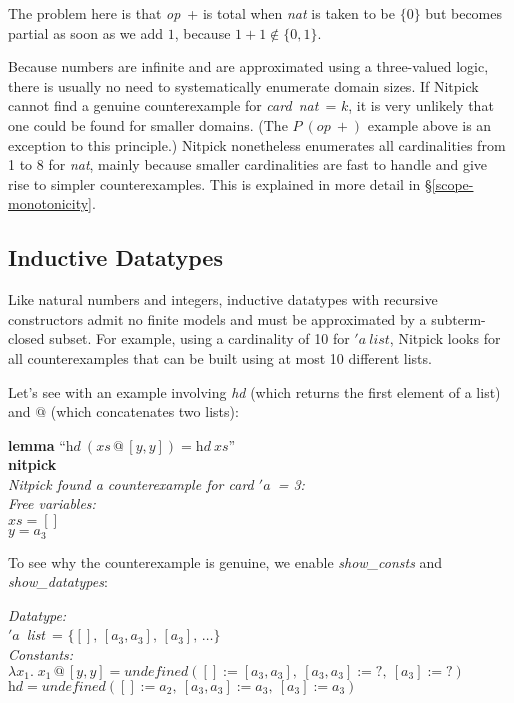 \documentclass[a4paper,12pt]{article}
\def\undef{\textit{undefined}}
\def\unk{{?}}
\def\unr{\ldots}
\begin{document}
The problem here is that \textit{op}~+ is total when \textit{nat} is taken to be
$\{0\}$ but becomes partial as soon as we add $1$, because $1 + 1 \notin \{0,
1\}$.

Because numbers are infinite and are approximated using a three-valued logic,
there is usually no need to systematically enumerate domain sizes. If Nitpick
cannot find a genuine counterexample for \textit{card~nat}~= $k$, it is very
unlikely that one could be found for smaller domains. (The $P~(\textit{op}~{+})$
example above is an exception to this principle.) Nitpick nonetheless enumerates
all cardinalities from 1 to 8 for \textit{nat}, mainly because smaller
cardinalities are fast to handle and give rise to simpler counterexamples. This
is explained in more detail in \S\ref{scope-monotonicity}.

\subsection{Inductive Datatypes}
\label{inductive-datatypes}

Like natural numbers and integers, inductive datatypes with recursive
constructors admit no finite models and must be approximated by a subterm-closed
subset. For example, using a cardinality of 10 for ${'}a~\textit{list}$,
Nitpick looks for all counterexamples that can be built using at most 10
different lists.

Let's see with an example involving \textit{hd} (which returns the first element
of a list) and $@$ (which concatenates two lists):

\prew
\textbf{lemma} ``$\textit{hd}~(\textit{xs} \mathbin{@} [y, y]) = \textit{hd}~\textit{xs}$'' \\
\textbf{nitpick} \\[2\smallskipamount]
\slshape Nitpick found a counterexample for \textit{card} $'a$~= 3: \\[2\smallskipamount]
\hbox{}\qquad Free variables: \nopagebreak \\
\hbox{}\qquad\qquad $\textit{xs} = []$ \\
\hbox{}\qquad\qquad $\textit{y} = a_3$
\postw

To see why the counterexample is genuine, we enable \textit{show\_consts}
and \textit{show\_\allowbreak datatypes}:

\prew
{\slshape Datatype:} \\
\hbox{}\qquad $'a$~\textit{list}~= $\{[],\, [a_3, a_3],\, [a_3],\, \unr\}$ \\
{\slshape Constants:} \\
\hbox{}\qquad $\lambda x_1.\; x_1 \mathbin{@} [y, y] = \undef([] := [a_3, a_3],\> [a_3, a_3] := \unk,\> [a_3] := \unk)$ \\
\hbox{}\qquad $\textit{hd} = \undef([] := a_2,\> [a_3, a_3] := a_3,\> [a_3] := a_3)$
\postw
\end{document}
